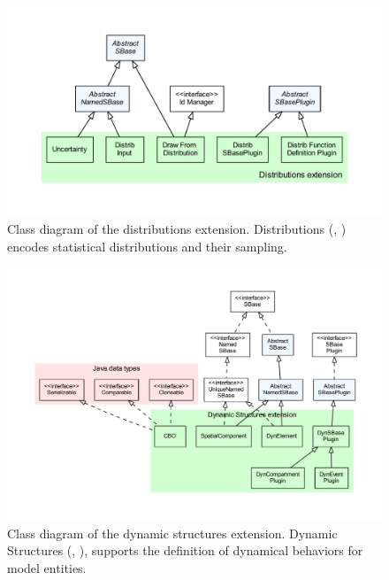 \begin{figure}[hb]
 \centering
 \vspace*{2ex}
 \includegraphics[width=\textwidth]{../../../extensions/distrib/doc/img/type_hierarchy.pdf}
 \caption[Class diagram of the distributions extension.]{ Class diagram of the distributions extension. Distributions 
 (, \cite{Moodie2013}) encodes statistical distributions and their sampling.}
 \label{fig:distrib}
\end{figure}

\begin{figure}[hb]
 \centering
 \vspace*{2ex}
 \includegraphics[width=\textwidth]{../../../extensions/dyn/doc/img/type_hierarchy.pdf}
 \caption[Class diagram of the dynamic structures extension]{Class diagram of the dynamic structures extension. Dynamic Structures (, \cite{Gomez2014}), supports the definition of dynamical behaviors for model entities.
}
 \label{fig:dyn}
\end{figure}


